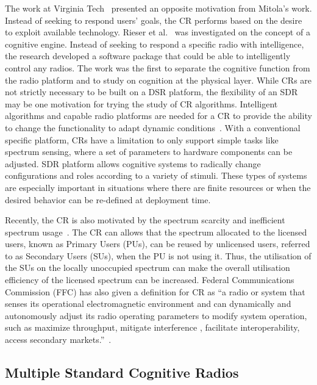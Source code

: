 The work at Virginia Tech~\cite{MacKenzie2009} presented an opposite motivation from Mitola’s work. Instead of seeking to respond users’ goals, the CR performs based on the desire
to exploit available technology. Rieser et al.~\cite{Rieser2007,Rondeau2004} was investigated on the concept of a cognitive engine. Instead of seeking to respond a specific radio with intelligence, the research
developed a software package that could be able to intelligently control any radios. The work was the first to separate the cognitive function from the radio platform and to study on cognition at the physical layer.
While CRs are not strictly necessary to be built on a DSR platform, the flexibility of an SDR may be one motivation for trying the study of CR algorithms.
Intelligent algorithms and capable radio platforms are needed for a CR to provide the ability to change the functionality to adapt dynamic conditions~\cite{MacKenzie2009}.
With a conventional specific platform, CRs have a limitation to only support simple tasks like spectrum sensing, where a set of parameters to hardware components can be adjusted. SDR platform allows cognitive systems to radically change configurations and roles according to a variety of stimuli. These types of systems are especially important in situations where there are finite resources or when the desired behavior can be re-defined at deployment time.

Recently, the CR is also motivated by the spectrum scarcity and inefficient spectrum usage~\cite{FCC2002,Ghasemi2008}. The CR can allows that the spectrum allocated to the licensed users, known as Primary Users (PUs), can be reused by unlicensed users, referred to as Secondary Users (SUs), when the PU is not using it. Thus, the utilisation of the SUs on the locally unoccupied spectrum can make the overall utilisation efficiency of the licensed spectrum can be increased. Federal Communications Commission (FFC) has also given a definition for CR as ``a radio or system that senses its operational electromagnetic environment and can dynamically and autonomously adjust its radio operating parameters to modify system operation, such as maximize throughput, mitigate interference , facilitate interoperability, access secondary markets.''~\cite{FCC2005}.

\subsection{Multiple Standard Cognitive Radios}

